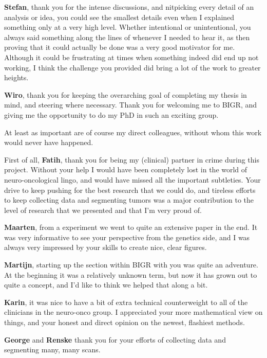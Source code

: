 \textbf{Stefan}, thank you for the intense discussions, and nitpicking every detail of an analysis or idea, you could see the smallest details even when I explained something only at a very high level.
Whether intentional or unintentional, you always said something along the lines of  whenever I needed to hear it, as then proving that it could actually be done was a very good motivator for me.
Although it could be frustrating at times when something indeed did end up not working, I think the challenge you provided did bring a lot of the work to greater heights.

\textbf{Wiro}, thank you for keeping the overarching goal of completing my thesis in mind, and steering where necessary.
Thank you for welcoming me to BIGR, and giving me the opportunity to do my PhD in such an exciting group.

At least as important are of course my direct colleagues, without whom this work would never have happened.

First of all, \textbf{Fatih}, thank you for being my (clinical) partner in crime during this project.
Without your help I would have been completely lost in the world of neuro-oncological lingo, and would have missed all the important subtleties.
Your drive to keep pushing for the best research that we could do, and tireless efforts to keep collecting data and segmenting tumors was a major contribution to the level of research that we presented and that I'm very proud of.

\textbf{Maarten}, from a  experiment we went to quite an extensive paper in the end.
It was very informative to see your perspective from the genetics side, and I was always very impressed by your skills to create nice, clear figures.

\textbf{Martijn}, starting up the  section within BIGR with you was quite an adventure.
At the beginning it was a relatively unknown term, but now it has grown out to quite a concept, and I'd like to think we helped that along a bit.

\textbf{Karin}, it was nice to have a bit of extra technical counterweight to all of the clinicians in the neuro-onco group.
I appreciated your more mathematical view on things, and your honest and direct opinion on the newest, flashiest methods.

\textbf{George} and \textbf{Renske} thank you for your efforts of collecting data and segmenting many, many scans.

